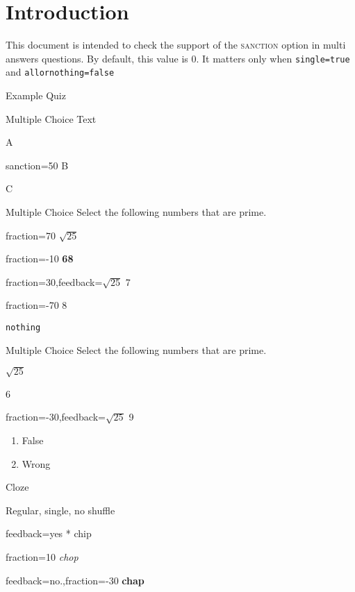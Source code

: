 \documentclass{article}
\begin{document}
\section*{Introduction}

This document is intended to check the support of the \textsc{sanction} option 
in multi answers questions. By default, this value is 0. It matters only when 
\texttt{single=true} and \texttt{allornothing=false}

\begin{quiz}[sanction=40]{Example Quiz}

\begin{multi}[sanction=100]{Multiple Choice}
Text
\item* A
\item[sanction=50] B
\item C
\end{multi}

\begin{multi}[sanction=10,multiple,feedback={abc\\def 
$\sqrt{2}$}]{Multiple Choice}
Select the following numbers that are prime.
\item[fraction=70] $\sqrt{25}$
\item[fraction=-10] \textbf{68}
\item[fraction=30,feedback={$\sqrt{25}$}] 7
\item[fraction=-70] 8
\item \texttt{nothing}
\end{multi}

\begin{multi}[shuffle,feedback={abc\\def $\sqrt{2}$}]{Multiple 
Choice}
Select the following numbers that are prime.
\item* $\sqrt{25}$
\item 6
\item[fraction=-30,feedback={$\sqrt{25}$}] 9
\item \begin{enumerate}
\item False
\item Wrong
\end{enumerate}
\end{multi}

\begin{cloze}{Cloze}
\begin{multi}[shuffle=false]
Regular, single, no shuffle
\item[feedback={yes}]* chip 
\item[fraction=10] \textit{chop} 
\item[feedback={no.},fraction=-30] \textbf{chap}
\end{multi}


\end{cloze}
\end{quiz}
\end{document}
